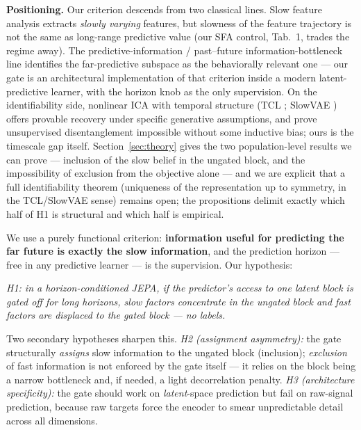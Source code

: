 \documentclass[10pt,twocolumn]{article}
\begin{document}
\textbf{Positioning.} Our criterion descends from two classical lines.
Slow feature analysis \cite{wiskott2002slow} extracts \emph{slowly
varying} features, but slowness of the feature trajectory is not the same as
long-range predictive value (our SFA control, Tab.~1, trades the regime away).
The predictive-information / past--future information-bottleneck line
\cite{bialek2001predictability,creutzig2009past} identifies the far-predictive
subspace as the behaviorally relevant one --- our gate is an architectural
implementation of that criterion inside a modern latent-predictive learner,
with the horizon knob as the only supervision. On the identifiability side,
nonlinear ICA with temporal structure (TCL \cite{hyvarinen2016unsupervised};
SlowVAE \cite{klindt2021towards}) offers provable recovery under specific
generative assumptions, and \cite{locatello2019challenging} prove unsupervised
disentanglement impossible without some inductive bias; ours is the timescale
gap itself. Section~\ref{sec:theory}
gives the two population-level results we can prove --- inclusion of the slow
belief in the ungated block, and the impossibility of exclusion from the
objective alone --- and we are explicit that a full identifiability theorem
(uniqueness of the representation up to symmetry, in the TCL/SlowVAE sense)
remains open; the propositions delimit exactly which half of H1 is structural
and which half is empirical.

We use a purely functional criterion: \textbf{information useful for
predicting the far future is exactly the slow information}, and the prediction
horizon --- free in any predictive learner --- is the supervision. Our
hypothesis:

\emph{H1: in a horizon-conditioned JEPA, if the predictor's access to one
latent block is gated off for long horizons, slow factors concentrate in the
ungated block and fast factors are displaced to the gated block --- no labels.}

Two secondary hypotheses sharpen this. \emph{H2 (assignment asymmetry):} the
gate structurally \emph{assigns} slow information to the ungated block
(inclusion); \emph{exclusion} of fast information is not enforced by the gate
itself --- it relies on the block being a narrow bottleneck and, if needed, a
light decorrelation penalty. \emph{H3
(architecture specificity):} the gate should work on \emph{latent}-space
prediction but fail on raw-signal prediction, because raw targets force the
encoder to smear unpredictable detail across all dimensions.
\end{document}
